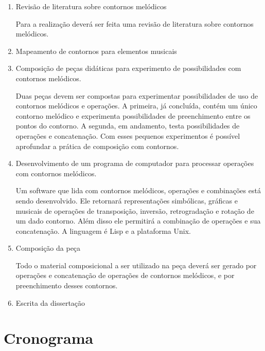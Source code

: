 \documentclass{article}
\begin{document}
\begin{enumerate}
\item Revisão de literatura sobre contornos melódicos

  Para a realização deverá ser feita uma revisão de literatura sobre
  contornos melódicos.

\item Mapeamento de contornos para elementos musicais

\item Composição de peças didáticas para experimento de possibilidades
  com contornos melódicos.

  Duas peças devem ser compostas para experimentar possibilidades de
  uso de contornos melódicos e operações. A primeira, já concluída,
  contém um único contorno melódico e experimenta possibilidades de
  preenchimento entre os pontos do contorno. A segunda, em andamento,
  testa possibilidades de operações e concatenação. Com esses pequenos
  experimentos é possível aprofundar a prática de composição com
  contornos.

\item Desenvolvimento de um programa de computador para processar
  operações com contornos melódicos.

  Um software que lida com contornos melódicos, operações e
  combinações está sendo desenvolvido. Ele retornará representações
  simbólicas, gráficas e musicais de operações de transposição,
  inversão, retrogradação e rotação de um dado contorno. Além disso
  ele permitirá a combinação de operações e sua concatenação. A
  linguagem é Lisp e a plataforma Unix.

  
\item Composição da peça

  Todo o material composicional a ser utilizado na peça deverá ser
  gerado por operações e concatenação de operações de contornos
  melódicos, e por preenchimento desses contornos.

\item Escrita da dissertação
\end{enumerate}

\section{Cronograma}
\label{sec:cronograma}
\end{document}
